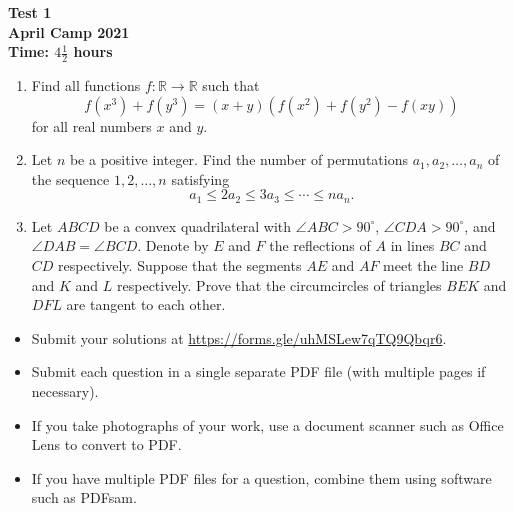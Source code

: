 \documentclass{article}
\begin{document}
\thispagestyle{empty}

\begin{center}
  \textbf{\Large Test 1}
  \\ \vspace{1em}
  \textbf{\large April Camp 2021}
  \\ \vspace{1em}
  \textbf{\large Time: $4\frac{1}{2}$ hours}
\end{center}

\vspace{24pt}

\begin{enumerate}[itemsep=18pt]

\item %
Find all functions $f: \mathbb{R} \to \mathbb{R}$ such that
\[
  f\left( x^3 \right) + f\left( y^3 \right) = (x + y)\left( f\left( x^2 \right) + f\left( y^2 \right) - f(xy) \right)
\]
for all real numbers $x$ and $y$.


\item %
Let $n$ be a positive integer.
Find the number of permutations $a_1, a_2, \dotsc, a_n$ of the sequence $1, 2, \dotsc, n$ satisfying
\[ a_1 \leq 2a_2 \leq 3a_3 \leq \dotsb \leq na_n. \]


\item %
Let $ABCD$ be a convex quadrilateral with $\angle ABC > 90^\circ$, $\angle CDA > 90^\circ$, and $\angle DAB = \angle BCD$.
Denote by $E$ and $F$ the reflections of $A$ in lines $BC$ and $CD$ respectively.
Suppose that the segments $AE$ and $AF$ meet the line $BD$ and $K$ and $L$ respectively.
Prove that the circumcircles of triangles $BEK$ and $DFL$ are tangent to each other.

\end{enumerate}


\vfill
\begin{itemize}
	\item Submit your solutions at \url{https://forms.gle/uhMSLew7qTQ9Qbqr6}.
	\item Submit each question in a single separate PDF file (with multiple pages if necessary).
	\item If you take photographs of your work, use a document scanner such as Office Lens to convert to PDF.
	\item If you have multiple PDF files for a question, combine them using software such as PDFsam.
\end{itemize}
\end{document}
